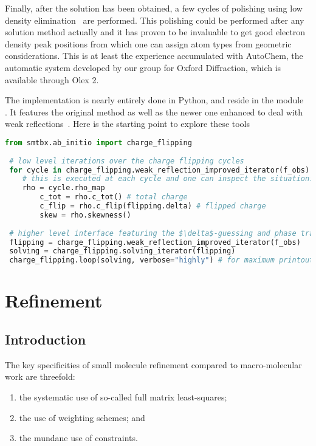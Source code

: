 \documentclass[12pt]{article}
\begin{document}
Finally, after the solution has been obtained, a few cycles of polishing using low density elimination~\cite{Shiono:1992} are performed. This polishing could be performed after any solution method actually and it has proven to be invaluable to get good electron density peak positions from which one can assign atom types from geometric considerations. This is at least the experience accumulated with AutoChem, the automatic system developed by our group for Oxford Diffraction, which is available through Olex 2.

The implementation is nearly entirely done in Python, and reside in the module\\ . It features the original method as well as the newer one enhanced to deal with weak reflections~\cite{Oszlanyi:2004}. Here is the starting point to explore these tools
 \begin{lstlisting}[language=Python]
 from smtbx.ab_initio import charge_flipping
 
 # low level iterations over the charge flipping cycles
 for cycle in charge_flipping.weak_reflection_improved_iterator(f_obs):
 	# this is executed at each cycle and one can inspect the situation:
	rho = cycle.rho_map
        c_tot = rho.c_tot() # total charge
        c_flip = rho.c_flip(flipping.delta) # flipped charge
        skew = rho.skewness()
 
 # higher level interface featuring the $\delta$-guessing and phase transition detection
 flipping = charge_flipping.weak_reflection_improved_iterator(f_obs)
 solving = charge_flipping.solving_iterator(flipping)
 charge_flipping.loop(solving, verbose="highly") # for maximum printout 
\end{lstlisting}

\section{Refinement}
\label{refinement}
\subsection{Introduction}

The key specificities of small molecule refinement compared to macro-molecular work are threefold:
\begin{enumerate}
\item the systematic use of so-called full matrix least-squares;\label{fullmatrix}
\item the use of weighting schemes; and \label{weightingschemes}
\item the mundane use of constraints.\label{constraints}
\end{enumerate}
\end{document}
